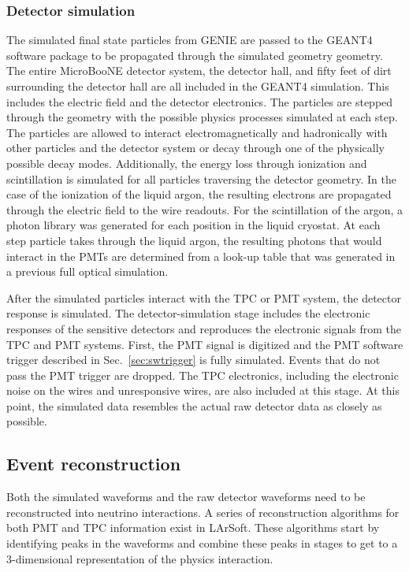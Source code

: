   \subsubsection{Detector simulation}
    The simulated final state particles from GENIE are passed to the
    GEANT4~\cite{geant4} software package to be propagated through the
    simulated geometry geometry. The entire MicroBooNE detector system, the
    detector hall, and fifty feet of dirt surrounding the detector hall are all
    included in the GEANT4 simulation. This includes the electric field and the
    detector electronics. The particles are stepped through the geometry with
    the possible physics processes simulated at each step. The particles are
    allowed to interact electromagnetically and hadronically with other
    particles and the detector system or decay through one of the physically
    possible decay modes. Additionally, the energy loss through ionization and
    scintillation is simulated for all particles traversing the detector
    geometry. In the case of the ionization of the liquid argon, the resulting
    electrons are propagated through the electric field to the wire readouts.
    For the scintillation of the argon, a photon library was generated for each
    position in the liquid cryostat. At each step particle takes through the
    liquid argon, the resulting photons that would interact in the PMTs are
    determined from a look-up table that was generated in a previous full
    optical simulation. 

    After the simulated particles interact with the TPC or PMT system, the
    detector response is simulated. The detector-simulation stage includes the
    electronic responses of the sensitive detectors and reproduces the
    electronic signals from the TPC and PMT systems. First, the PMT signal is
    digitized and the PMT software trigger described in
    Sec.~\ref{sec:swtrigger} is fully simulated. Events that do not pass the
    PMT trigger are dropped. The TPC electronics, including the electronic
    noise on the wires and unresponsive wires, are also included at this stage.
    At this point, the simulated data resembles the actual raw detector data as
    closely as possible.

\subsection{Event reconstruction}\label{sec:reco}
Both the simulated waveforms and the raw detector waveforms need to be
reconstructed into neutrino interactions. A series of reconstruction algorithms
for both PMT and TPC information exist in LArSoft. These algorithms start by
identifying peaks in the waveforms and combine these peaks in stages to get to
a 3-dimensional representation of the physics interaction.

